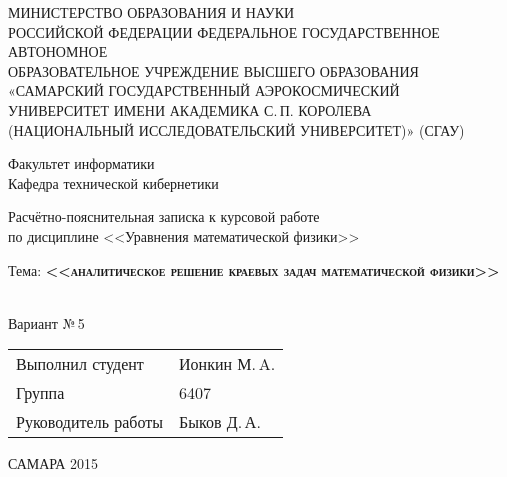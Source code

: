 \begin{titlepage}
  \begin{center}
			МИНИСТЕРСТВО ОБРАЗОВАНИЯ И НАУКИ \\ РОССИЙСКОЙ ФЕДЕРАЦИИ 
			\vspace{0.5cm}
			\linebreak  ФЕДЕРАЛЬНОЕ ГОСУДАРСТВЕННОЕ АВТОНОМНОЕ \\
			ОБРАЗОВАТЕЛЬНОЕ УЧРЕЖДЕНИЕ ВЫСШЕГО ОБРАЗОВАНИЯ	\\
			«САМАРСКИЙ ГОСУДАРСТВЕННЫЙ АЭРОКОСМИЧЕСКИЙ \\
			УНИВЕРСИТЕТ ИМЕНИ АКАДЕМИКА С.\,П. КОРОЛЕВА \\
			(НАЦИОНАЛЬНЫЙ ИССЛЕДОВАТЕЛЬСКИЙ УНИВЕРСИТЕТ)» (СГАУ) 
		\vspace{0.25cm} \\
		\begin{large}
			Факультет информатики \\
			Кафедра технической кибернетики\\	
		\end{large} 
		\vspace{1cm} 
		Расчётно-пояснительная записка к курсовой работе\\
		по дисциплине <<Уравнения математической физики>> 
		\vspace{1.5cm} \\
		\begin{large}
		Тема: 	 \textbf{<<\textsc{аналитическое решение краевых задач  математической физики}>>}
		\end{large}		
		\vspace{1cm} \\ 
		Вариант №\,5
	\end{center}
	\vspace{3cm} 
		\begin{tabular}{ll}
		Выполнил студент & Ионкин М.\,A. \\ 
		Группа & 6407 \\ 
		Руководитель работы & Быков Д.\,А. 
		\end{tabular} 	
	\vspace{\fill}
	\begin{center}
		САМАРА 2015
	\end{center}
\end{titlepage}